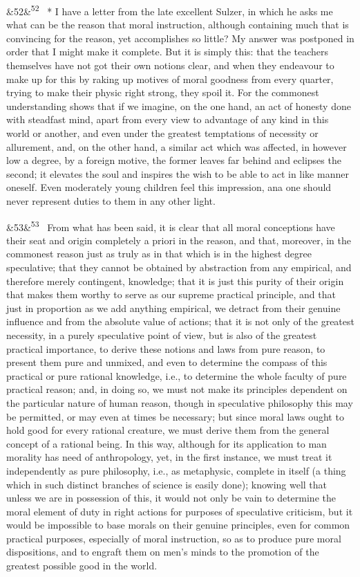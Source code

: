 \documentclass[12pt]{article}
\newcommand{\para}[1][]{\par\noindent\ifx&#1&\else\textsuperscript{\footnotesize #1}~\fi}
\begin{document}
\para[52] * I have a letter from the late excellent Sulzer, in which he asks me what can be the reason that moral instruction, although containing much that is convincing for the reason, yet accomplishes so little? My answer was postponed in order that I might make it complete. But it is simply this: that the teachers themselves have not got their own notions clear, and when they endeavour to make up for this by raking up motives of moral goodness from every quarter, trying to make their physic right strong, they spoil it. For the commonest understanding shows that if we imagine, on the one hand, an act of honesty done with steadfast mind, apart from every view to advantage of any kind in this world or another, and even under the greatest temptations of necessity or allurement, and, on the other hand, a similar act which was affected, in however low a degree, by a foreign motive, the former leaves far behind and eclipses the second; it elevates the soul and inspires the wish to be able to act in like manner oneself. Even moderately young children feel this impression, ana one should never represent duties to them in any other light.

\para[53] From what has been said, it is clear that all moral conceptions have their seat and origin completely a priori in the reason, and that, moreover, in the commonest reason just as truly as in that which is in the highest degree speculative; that they cannot be obtained by abstraction from any empirical, and therefore merely contingent, knowledge; that it is just this purity of their origin that makes them worthy to serve as our supreme practical principle, and that just in proportion as we add anything empirical, we detract from their genuine influence and from the absolute value of actions; that it is not only of the greatest necessity, in a purely speculative point of view, but is also of the greatest practical importance, to derive these notions and laws from pure reason, to present them pure and unmixed, and even to determine the compass of this practical or pure rational knowledge, i.e., to determine the whole faculty of pure practical reason; and, in doing so, we must not make its principles dependent on the particular nature of human reason, though in speculative philosophy this may be permitted, or may even at times be necessary; but since moral laws ought to hold good for every rational creature, we must derive them from the general concept of a rational being. In this way, although for its application to man morality has need of anthropology, yet, in the first instance, we must treat it independently as pure philosophy, i.e., as metaphysic, complete in itself (a thing which in such distinct branches of science is easily done); knowing well that unless we are in possession of this, it would not only be vain to determine the moral element of duty in right actions for purposes of speculative criticism, but it would be impossible to base morals on their genuine principles, even for common practical purposes, especially of moral instruction, so as to produce pure moral dispositions, and to engraft them on men's minds to the promotion of the greatest possible good in the world.
\end{document}
